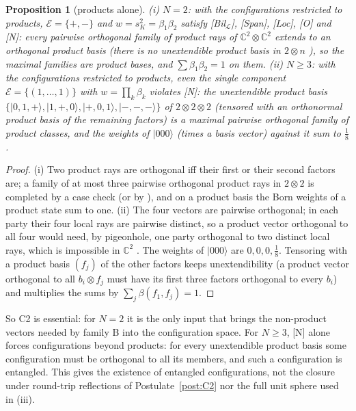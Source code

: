 \documentclass[aps,pra,onecolumn,superscriptaddress,nofootinbib,10pt]{revtex4-2}
\newtheorem{proposition}[theorem]{Proposition}
\theoremstyle{definition}
\theoremstyle{remark}
\newcommand{\C}{\mathbb{C}}
\newcommand{\cL}{\mathcal{L}}
\begin{document}
\begin{proposition}[products alone]\label{prop:productsalone}
(i) $N=2$: with the configurations restricted to products, $\mathcal E=\{+,-\}$ and $w=s_K^2=\beta_1\beta_2$ satisfy
[Bil$_\cL$], [Span], [Loc], [O] and [N]: every pairwise orthogonal family of product rays of $\C^2\otimes\C^2$
extends to an orthogonal product basis (there is no unextendible product basis in $2\otimes n$
\cite{DiVincenzo03}), so the maximal families are product bases, and $\sum\beta_1\beta_2=1$ on them.
(ii) $N\ge3$: with the configurations restricted to products, even the single component $\mathcal E=\{(1,\dots,1)\}$
with $w=\prod_k\beta_k$ violates [N]: the unextendible product basis
$\{\lvert0,1,{+}\rangle,\lvert1,{+},0\rangle,\lvert{+},0,1\rangle,\lvert{-},{-},{-}\rangle\}$ of $2\otimes2\otimes2$ \cite{Bennett99} (tensored with an
orthonormal product basis of the remaining factors) is a maximal pairwise orthogonal family of product
classes, and the weights of $\lvert000\rangle$ (times a basis vector) against it sum to $\tfrac18$.
\end{proposition}
\begin{proof}
(i) Two product rays are orthogonal iff their first or their second factors are; a family of at most three
pairwise orthogonal product rays in $2\otimes2$ is completed by a case check (or by \cite{DiVincenzo03}), and on
a product basis the Born weights of a product state sum to one.  (ii) The four vectors are pairwise
orthogonal; in each party their four local rays are pairwise distinct, so a product vector orthogonal to
all four would need, by pigeonhole, one party orthogonal to two distinct local rays, which is impossible
in $\C^2$ \cite{Bennett99}.  The weights of $\lvert000\rangle$ are $0,0,0,\tfrac18$.  Tensoring with a product basis
$(f_j)$ of the other factors keeps unextendibility (a product vector orthogonal to all $b_i\otimes f_j$ must
have its first three factors orthogonal to every $b_i$) and multiplies the sums by $\sum_j\beta(f_1,f_j)=1$.
\end{proof}
So C2 is essential: for $N=2$ it is the only input that brings the non-product vectors needed by family
B into the configuration space.  For $N\ge3$, [N] alone forces configurations beyond products: for every
unextendible product basis some configuration must be orthogonal to all its members, and such a
configuration is entangled.  This gives the existence of entangled configurations, not the closure
under round-trip reflections of Postulate~\ref{post:C2} nor the full unit sphere used in (iii).
\end{document}
